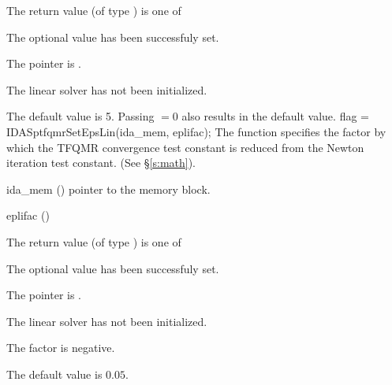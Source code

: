 {{\begin{args}
  \end{args}
}
{
  The return value  (of type ) is one of
  \begin{args}
  \item[\Id{IDASPTFQMR\_SUCCESS}] 
    The optional value has been successfuly set.
  \item[\Id{IDASPTFQMR\_MEM\_NULL}]
    The  pointer is .
  \item[\Id{IDASPTFQMR\_LMEM\_NULL}]
    The {\idasptfqmr} linear solver has not been initialized.
  \end{args}
}
{
  The default value is 5.  Passing  $= 0$ also results in the
  default value. 
}
{
  flag = IDASptfqmrSetEpsLin(ida\_mem, eplifac);
}
{
  The function  specifies the factor by
  which the TFQMR convergence test constant is reduced
  from the Newton iteration test constant. (See \S\ref{s:math}).
}
{
  \begin{args}
  \item[ida\_mem] ()
    pointer to the {\ida} memory block.
  \item[eplifac] ()

  \end{args}
}
{
  The return value  (of type ) is one of
  \begin{args}
  \item[\Id{IDASPTFQMR\_SUCCESS}] 
    The optional value has been successfuly set.
  \item[\Id{IDASPTFQMR\_MEM\_NULL}]
    The  pointer is .
  \item[\Id{IDASPTFQMR\_LMEM\_NULL}]
    The {\idasptfqmr} linear solver has not been initialized.
  \item[\Id{IDASPTFQMR\_ILL\_INPUT}]
    The factor  is negative.  
  \end{args}
}
{
  The default value is $0.05$.

}}
